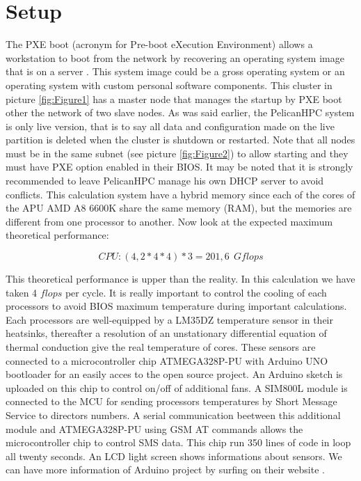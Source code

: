 \documentclass[11pt,a4paper]{article}
\begin{document}
\section{Setup}
\noindent
The PXE boot (acronym for Pre-boot eXecution Environment) allows a workstation to boot from the network by recovering an operating system image that is on a server \cite{tuto1}. This system image could be a gross operating system or an operating system with custom personal software components. This cluster in picture \ref{fig:Figure1} has a master node that manages the startup by PXE boot other the network of two slave nodes. As was said earlier, the PelicanHPC system is only live version, that is to say all data and configuration made on the live partition is deleted when the cluster is shutdown or restarted. Note that all nodes must be in the same subnet (see picture \ref{fig:Figure2}) to allow starting and they must have PXE option enabled in their BIOS. It may be noted that it is strongly recommended to leave PelicanHPC manage his own DHCP server to avoid conflicts. This calculation system have a hybrid memory since each of the cores of the APU AMD A8 6600K share the same memory (RAM), but the memories are different from one processor to another. Now look at the expected maximum theoretical performance:

\begin{equation}\label{eq:1}
CPU : (4,2*4*4)*3=201,6 \:\: Gflops
\end{equation}

\noindent
This theoretical performance is upper than the reality. In this calculation we have taken 4 $flops$ per cycle. It is really important to control the cooling of each processors to avoid BIOS maximum temperature during important calculations. Each processors are well-equipped by a LM35DZ temperature sensor in their heatsinks, thereafter a resolution of an unstationary differential equation of thermal conduction give the real temperature of cores. These sensors are connected to a microcontroller chip ATMEGA328P-PU with Arduino UNO bootloader for an easily acces to the open source project. An Arduino sketch is uploaded on this chip to control on/off of additional fans. A SIM800L module is connected to the MCU for sending processors temperatures by Short Message Service to directors numbers. A serial communication beetween this additional module and ATMEGA328P-PU using GSM AT commands allows the microcontroller chip to control SMS data. This chip run 350 lines of code in loop all twenty seconds. An LCD light screen shows informations about sensors. We can have more information of Arduino project by surfing on their website \cite{arduino}.
\end{document}

